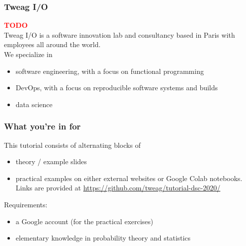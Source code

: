 \documentclass[t,aspectratio=169]{beamer}
\newcommand{\todo}{\textcolor{red}{\textbf{TODO}}}
\begin{document}
\begin{frame}
  \frametitle{Tweag I/O}
  \todo \\
  Tweag I/O is a software innovation lab and consultancy based in Paris with employees all around the world.\\
  We specialize in
  \begin{itemize}
  \item software engineering, with a focus on functional programming
  \item DevOps, with a focus on reproducible software systems and builds
  \item data science
  \end{itemize}
\end{frame}


\begin{frame}
  \frametitle{What you're in for}
  This tutorial consists of alternating blocks of
  \begin{itemize}
  \item theory / example slides
  \item practical examples on either external websites or Google Colab notebooks. Links are provided at {\centering \url{https://github.com/tweag/tutorial-dsc-2020/}}
  \end{itemize}

  Requirements:
  \begin{itemize}
  \item a Google account (for the practical exercises)
  \item elementary knowledge in probability theory and statistics
  \end{itemize}
\end{frame}




\end{document}
